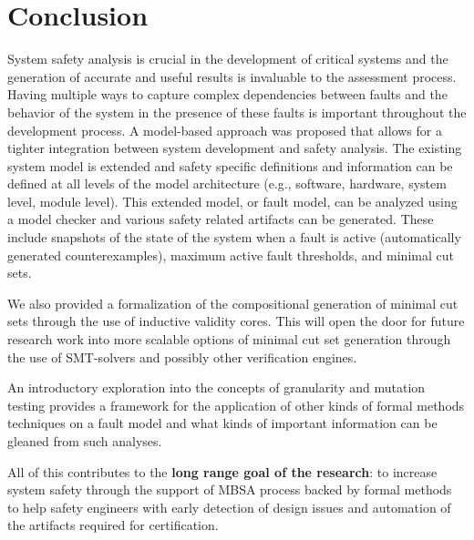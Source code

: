 \chapter{Conclusion}
\label{chap:conclusion}
System safety analysis is crucial in the development of critical systems and the generation of accurate and useful results is invaluable to the assessment process. Having multiple ways to capture complex dependencies between faults and the behavior of the system in the presence of these faults is important throughout the development process. A model-based approach was proposed that allows for a tighter integration between system development and safety analysis. The existing system model is extended and safety specific definitions and information can be defined at all levels of the model architecture (e.g., software, hardware, system level, module level). This extended model, or fault model, can be analyzed using a model checker and various safety related artifacts can be generated. These include snapshots of the state of the system when a fault is active (automatically generated counterexamples), maximum active fault thresholds, and minimal cut sets. 

We also provided a formalization of the compositional generation of minimal cut sets through the use of inductive validity cores. This will open the door for future research work into more scalable options of minimal cut set generation through the use of SMT-solvers and possibly other verification engines. 

An introductory exploration into the concepts of granularity and mutation testing provides a framework for the application of other kinds of formal methods techniques on a fault model and what kinds of important information can be gleaned from such analyses. 

All of this contributes to the \textbf{long range goal of the research}: to increase system safety through the support of MBSA process backed by formal methods to help safety engineers with early detection of design issues and automation of the artifacts required for certification. 